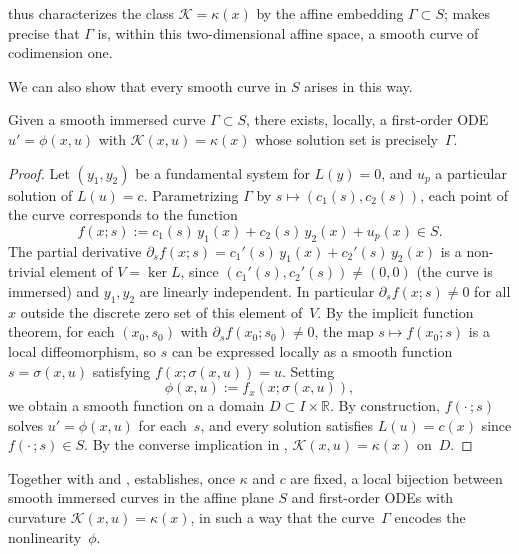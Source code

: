 \documentclass[preprint,a4paper]{elsarticle}
\begin{document}
 thus characterizes the class $\mathcal{K}=\kappa(x)$ by the affine embedding $\Gamma\subset S$;  makes precise that $\Gamma$ is, within this two-dimensional affine space, a smooth curve of codimension one.

We can also show that every smooth curve in $S$ arises in this way.

\begin{proposition}\label{prop:converse_embedding}
Given a smooth immersed curve $\Gamma\subset S$, there exists, locally, a first-order ODE $u'=\phi(x,u)$ with $\mathcal{K}(x,u)=\kappa(x)$ whose solution set is precisely~$\Gamma$.
\end{proposition}

\begin{proof}
Let $(y_1,y_2)$ be a fundamental system for $L(y)=0$, and $u_p$ a particular solution of $L(u)=c$. Parametrizing $\Gamma$ by $s\mapsto(c_1(s),c_2(s))$, each point of the curve corresponds to the function
\[
f(x;s):= c_1(s)\,y_1(x)+c_2(s)\,y_2(x)+u_p(x)\in S.
\]
The partial derivative $\partial_s f(x;s)=c_1'(s)\,y_1(x)+c_2'(s)\,y_2(x)$ is a non-trivial element of $V=\ker L$, since $(c_1'(s),c_2'(s))\neq(0,0)$ (the curve is immersed) and $y_1,y_2$ are linearly independent. In particular $\partial_s f(x;s)\neq 0$ for all $x$ outside the discrete zero set of this element of~$V$. By the implicit function theorem, for each $(x_0,s_0)$ with $\partial_s f(x_0;s_0)\neq 0$, the map $s\mapsto f(x_0;s)$ is a local diffeomorphism, so $s$ can be expressed locally as a smooth function $s=\sigma(x,u)$ satisfying $f(x;\sigma(x,u))=u$. Setting
\[
\phi(x,u):= f_x(x;\sigma(x,u)),
\]
we obtain a smooth function on a domain $D\subset I\times\mathbb{R}$. By construction, $f(\cdot\,;s)$ solves $u'=\phi(x,u)$ for each~$s$, and every solution satisfies $L(u)=c(x)$ since $f(\cdot\,;s)\in S$. By the converse implication in , $\mathcal{K}(x,u)=\kappa(x)$ on~$D$.
\end{proof}

Together with  and ,  establishes, once $\kappa$ and $c$ are fixed, a local bijection between smooth immersed curves in the affine plane $S$ and first-order ODEs with curvature $\mathcal{K}(x,u)=\kappa(x)$, in such a way that the curve~$\Gamma$ encodes the nonlinearity~$\phi$.
\end{document}
